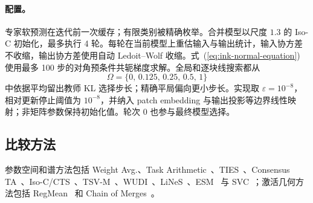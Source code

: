 \paragraph{\method{} 配置。}
专家软预测在迭代前一次缓存；有限类别被精确枚举。合并模型以尺度 $1.3$ 的 Iso-C 初始化，最多执行 4 轮。每轮在当前模型上重估输入与输出统计，输入协方差不收缩，输出协方差使用自动 Ledoit--Wolf 收缩。式~(\ref{eq:ink-normal-equation}) 使用最多 100 步的对角预条件共轭梯度求解。全局和逐块线搜索都从
\begin{equation}
  \Omega=\{0,\,0.125,\,0.25,\,0.5,\,1\}
\end{equation}
中依据平均留出教师 KL 选择步长；精确平局偏向更小步长。实现取 $\varepsilon=10^{-8}$，相对更新停止阈值为 $10^{-8}$，并纳入 patch embedding 与输出投影等边界线性映射；非矩阵参数保持初始化值。轮次 0 也参与最终模型选择。

\subsection{比较方法}
参数空间和谱方法包括 Weight Avg.、Task Arithmetic~\citep{ilharco2023editing}、TIES~\citep{yadav2023ties}、Consensus TA~\citep{wang2024localizing}、Iso-C/CTS~\citep{marczak2025no}、TSV-M~\citep{gargiulo2024task}、WUDI~\citep{xiong2024adaptive}、LiNeS~\citep{wang2024lines}、ESM~\citep{li2026essential} 与 SVC~\citep{li2026spectral}；激活几何方法包括 RegMean~\citep{jin2023regmean} 和 Chain of Merges~\citep{buzzega2025chain}。
